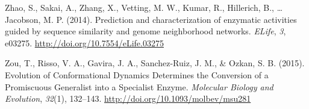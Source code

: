 \documentclass[12pt,twoside]{reedthesis}
\begin{document}
  \hypertarget{ref-zhaoux5fpredictionux5f2014}{}
  Zhao, S., Sakai, A., Zhang, X., Vetting, M. W., Kumar, R., Hillerich,
  B., \ldots{} Jacobson, M. P. (2014). Prediction and characterization of
  enzymatic activities guided by sequence similarity and genome
  neighborhood networks. \emph{ELife}, \emph{3}, e03275.
  \url{http://doi.org/10.7554/eLife.03275}
  
  \hypertarget{ref-zouux5fevolutionux5f2015}{}
  Zou, T., Risso, V. A., Gavira, J. A., Sanchez-Ruiz, J. M., \& Ozkan, S.
  B. (2015). Evolution of Conformational Dynamics Determines the
  Conversion of a Promiscuous Generalist into a Specialist Enzyme.
  \emph{Molecular Biology and Evolution}, \emph{32}(1), 132--143.
  \url{http://doi.org/10.1093/molbev/msu281}


\end{document}
